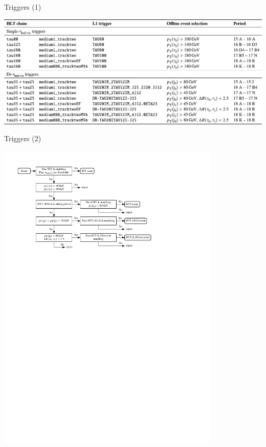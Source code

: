 \documentclass[11pt, xcolor={dvipsnames}, aspectratio=169, notes]{beamer}
\begin{document}

\begin{frame}{Triggers (1)}
  \centering

  \includegraphics[width=\textwidth]{backup/triggers}
\end{frame}


\begin{frame}{Triggers (2)}
  \centering

  \includegraphics[width=0.8\textwidth]{selection/trigger_flowchart}
\end{frame}
\end{document}
